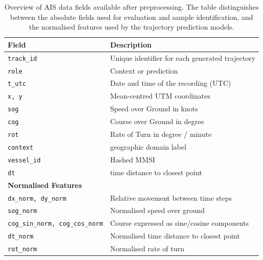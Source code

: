  \begin{table}[t]
    \centering
    \begin{tabular}{ll}
    \toprule
    Field & Description \\
    \midrule
    \texttt{track\_id} & Unique identifier for each generated trajectory \\
    \texttt{role} & Context or prediction \\
    \texttt{t\_utc} & Date and time of the recording (UTC) \\
    \texttt{x, y} & Mean-centred UTM coordinates \\%
    \texttt{sog} & Speed over Ground in knots\\
    \texttt{cog} & Course over Ground in degree\\
    \texttt{rot} &  Rate of Turn in degree / minute \\
    \texttt{context} & geographic domain label \\%
    \texttt{vessel\_id} & Hashed MMSI \\
    \texttt{dt} & time distance to closest point \\
    \midrule
    \multicolumn{2}{l}{\textbf{Normalised Features}} \\
    \texttt{dx\_norm, dy\_norm} & Relative movement between time steps \\
    \texttt{sog\_norm} & Normalised speed over ground \\
    \texttt{cog\_sin\_norm, cog\_cos\_norm} & Course expressed as sine/cosine components \\
    \texttt{dt\_norm} & Normalised time distance to closest point \\
    \texttt{rot\_norm} & Normalised rate of turn \\
    \bottomrule
    \end{tabular}
    \caption[Overview of AIS Data Fields]{Overview of \acf{AIS} data fields available after preprocessing. The table distinguishes between the absolute fields used for evaluation and sample identification, and the normalised features used by the trajectory prediction models. 
    }
    \label{tab:unified-format}
\end{table}


